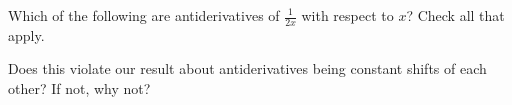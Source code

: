 \documentclass{ximera}
\author{Steven Gubkin}
\begin{document}
\begin{exercise}

Which of the following are antiderivatives of $\frac{1}{2x}$ with respect to $x$?  Check all that apply.

\begin{selectAll}
\end{selectAll}

Does this violate our result about antiderivatives being constant shifts of each other?  If not, why not?

\end{exercise}
\end{document}
